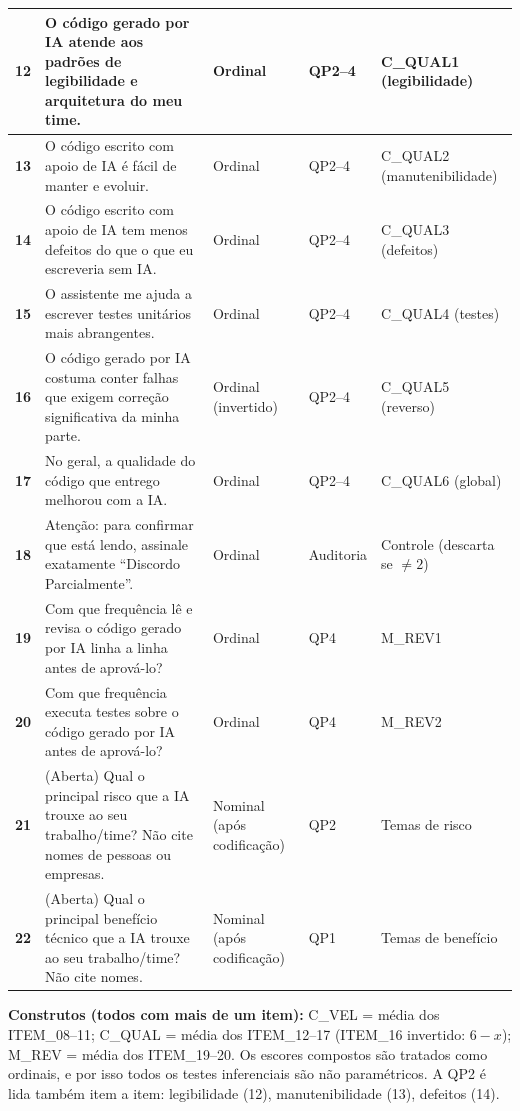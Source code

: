 {\begin{longtable}{|L{0.55cm}|L{7.35cm}|L{1.85cm}|L{1.65cm}|L{4.25cm}|}
\textbf{12} & O código gerado por IA atende aos padrões de legibilidade e arquitetura do meu time. & Ordinal & QP2--4 & C\_QUAL1 (legibilidade) \\ \hline
\textbf{13} & O código escrito com apoio de IA é fácil de manter e evoluir. & Ordinal & QP2--4 & C\_QUAL2 (manutenibilidade) \\ \hline
\textbf{14} & O código escrito com apoio de IA tem menos defeitos do que o que eu escreveria sem IA. & Ordinal & QP2--4 & C\_QUAL3 (defeitos) \\ \hline
\textbf{15} & O assistente me ajuda a escrever testes unitários mais abrangentes. & Ordinal & QP2--4 & C\_QUAL4 (testes) \\ \hline
\textbf{16} & O código gerado por IA costuma conter falhas que exigem correção significativa da minha parte. & Ordinal (invertido) & QP2--4 & C\_QUAL5 (reverso) \\ \hline
\textbf{17} & No geral, a qualidade do código que entrego melhorou com a IA. & Ordinal & QP2--4 & C\_QUAL6 (global) \\ \hline
\textbf{18} & Atenção: para confirmar que está lendo, assinale exatamente \enquote{Discordo Parcialmente}. & Ordinal & Auditoria & Controle (descarta se $\neq 2$) \\ \hline
\textbf{19} & Com que frequência lê e revisa o código gerado por IA linha a linha antes de aprová-lo? & Ordinal & QP4 & M\_REV1 \\ \hline
\textbf{20} & Com que frequência executa testes sobre o código gerado por IA antes de aprová-lo? & Ordinal & QP4 & M\_REV2 \\ \hline
\textbf{21} & (Aberta) Qual o principal risco que a IA trouxe ao seu trabalho/time? Não cite nomes de pessoas ou empresas. & Nominal (após codificação) & QP2 & Temas de risco \\ \hline
\textbf{22} & (Aberta) Qual o principal benefício técnico que a IA trouxe ao seu trabalho/time? Não cite nomes. & Nominal (após codificação) & QP1 & Temas de benefício \\ \hline
\end{longtable}
}

\textbf{Construtos (todos com mais de um item):} C\_VEL = média dos ITEM\_08--11; C\_QUAL = média dos ITEM\_12--17 (ITEM\_16 invertido: $6 - x$); M\_REV = média dos ITEM\_19--20. Os escores compostos são tratados como ordinais, e por isso todos os testes inferenciais são não paramétricos. A QP2 é lida também item a item: legibilidade (12), manutenibilidade (13), defeitos (14).
